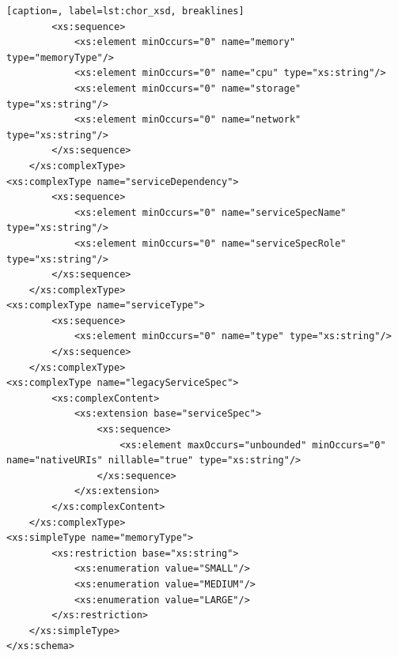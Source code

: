 {\begin{lstlisting}[caption=, label=lst:chor_xsd, breaklines]
        <xs:sequence>
            <xs:element minOccurs="0" name="memory" type="memoryType"/>
            <xs:element minOccurs="0" name="cpu" type="xs:string"/>
            <xs:element minOccurs="0" name="storage" type="xs:string"/>
            <xs:element minOccurs="0" name="network" type="xs:string"/>
        </xs:sequence>
    </xs:complexType>
<xs:complexType name="serviceDependency">
        <xs:sequence>
            <xs:element minOccurs="0" name="serviceSpecName" type="xs:string"/>
            <xs:element minOccurs="0" name="serviceSpecRole" type="xs:string"/>
        </xs:sequence>
    </xs:complexType>
<xs:complexType name="serviceType">
        <xs:sequence>
            <xs:element minOccurs="0" name="type" type="xs:string"/>
        </xs:sequence>
    </xs:complexType>
<xs:complexType name="legacyServiceSpec">
        <xs:complexContent>
            <xs:extension base="serviceSpec">
                <xs:sequence>
                    <xs:element maxOccurs="unbounded" minOccurs="0" name="nativeURIs" nillable="true" type="xs:string"/>
                </xs:sequence>
            </xs:extension>
        </xs:complexContent>
    </xs:complexType>
<xs:simpleType name="memoryType">
        <xs:restriction base="xs:string">
            <xs:enumeration value="SMALL"/>
            <xs:enumeration value="MEDIUM"/>
            <xs:enumeration value="LARGE"/>
        </xs:restriction>
    </xs:simpleType>
</xs:schema>


\end{lstlisting}}
